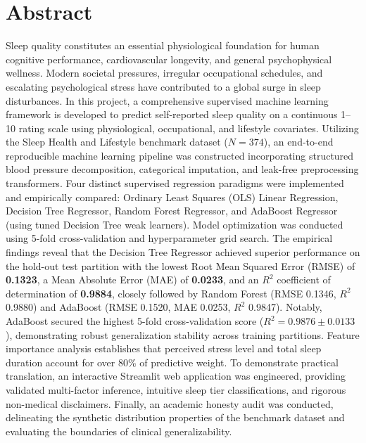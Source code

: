 \documentclass[12pt,a4paper]{article}
\begin{document}
\section{Abstract}
Sleep quality constitutes an essential physiological foundation for human cognitive performance, cardiovascular longevity, and general psychophysical wellness. Modern societal pressures, irregular occupational schedules, and escalating psychological stress have contributed to a global surge in sleep disturbances. In this project, a comprehensive supervised machine learning framework is developed to predict self-reported sleep quality on a continuous 1--10 rating scale using physiological, occupational, and lifestyle covariates. Utilizing the Sleep Health and Lifestyle benchmark dataset ($N=374$), an end-to-end reproducible machine learning pipeline was constructed incorporating structured blood pressure decomposition, categorical imputation, and leak-free preprocessing transformers. Four distinct supervised regression paradigms were implemented and empirically compared: Ordinary Least Squares (OLS) Linear Regression, Decision Tree Regressor, Random Forest Regressor, and AdaBoost Regressor (using tuned Decision Tree weak learners). Model optimization was conducted using 5-fold cross-validation and hyperparameter grid search. The empirical findings reveal that the Decision Tree Regressor achieved superior performance on the hold-out test partition with the lowest Root Mean Squared Error (RMSE) of \textbf{0.1323}, a Mean Absolute Error (MAE) of \textbf{0.0233}, and an $R^2$ coefficient of determination of \textbf{0.9884}, closely followed by Random Forest (RMSE 0.1346, $R^2$ 0.9880) and AdaBoost (RMSE 0.1520, MAE 0.0253, $R^2$ 0.9847). Notably, AdaBoost secured the highest 5-fold cross-validation score ($R^2 = 0.9876 \pm 0.0133$), demonstrating robust generalization stability across training partitions. Feature importance analysis establishes that perceived stress level and total sleep duration account for over 80\% of predictive weight. To demonstrate practical translation, an interactive Streamlit web application was engineered, providing validated multi-factor inference, intuitive sleep tier classifications, and rigorous non-medical disclaimers. Finally, an academic honesty audit was conducted, delineating the synthetic distribution properties of the benchmark dataset and evaluating the boundaries of clinical generalizability.

\end{document}
